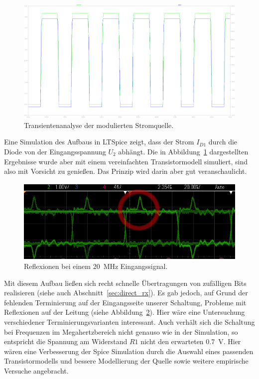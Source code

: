 \documentclass[12pt,a4paper]{article}
\begin{document}
\begin{figure}[!h]
  \centering
    \includegraphics[width=1.0\textwidth]{../spice/current_input_v_current_out_trans.png}
  \caption{Transientenanalyse der modulierten Stromquelle.}
  \label{fig:modulated_current_source_plot}
\end{figure}


Eine Simulation des Aufbaus in LTSpice zeigt, dass der Strom $I_{D1}$ durch die Diode von der Eingangsspannung $U_2$ abhängt. Die in Abbildung~\ref{fig:modulated_current_source_plot} dargestellten Ergebnisse wurde aber mit einem vereinfachten Transistormodell simuliert, sind also mit Vorsicht zu genießen. Das Prinzip wird darin aber gut veranschaulicht.

\begin{figure}[!h]
  \centering
    \includegraphics[width=1.0\textwidth]{img/ring_20MHz.png}
  \caption{Reflexionen bei einem \SI{20}{\mega\hertz} Eingangssignal.}
  \label{fig:ring_20mhz}
\end{figure}

Mit diesem Aufbau ließen sich recht schnelle Übertragungen von zufälligen Bits realisieren (siehe auch Abschnitt~\ref{sec:direct_rx}). Es gab jedoch, auf Grund der fehlenden Terminierung auf der Eingangsseite unserer Schaltung, Probleme mit Reflexionen auf der Leitung (siehe Abbildung~\ref{fig:ring_20mhz}). Hier wäre eine Untersuchung verschiedener Terminierungsvarianten interessant. Auch verhält sich die Schaltung bei Frequenzen im Megahertzbereich nicht genauso wie in der Simulation, so entspricht die Spannung am Widerstand $R1$ nicht den erwarteten \SI{0.7}{\volt}. Hier wären eine Verbesserung der Spice Simulation durch die Auswahl eines passenden Transistormodells und bessere Modellierung der Quelle sowie weitere empirische Versuche angebracht.
\end{document}
